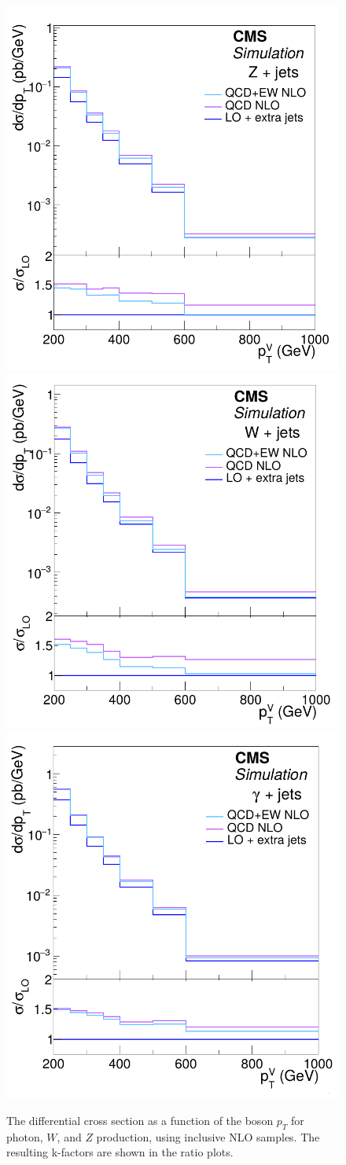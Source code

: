 \begin{figure}[ht]
  \centering
 \includegraphics[width=.49\textwidth]{Z_kfactor.png} 
 \includegraphics[width=.49\textwidth]{W_kfactor.png} \\
 \includegraphics[width=.49\textwidth]{gamma_kfactor.png} 
 \caption{The differential cross section as a function of the boson $p_T$ for photon, $W$, and $Z$ production, using inclusive \ac{NLO} samples. The resulting k-factors are shown in the ratio plots.}
 \label{fig:kfactors_15}
\end{figure}


